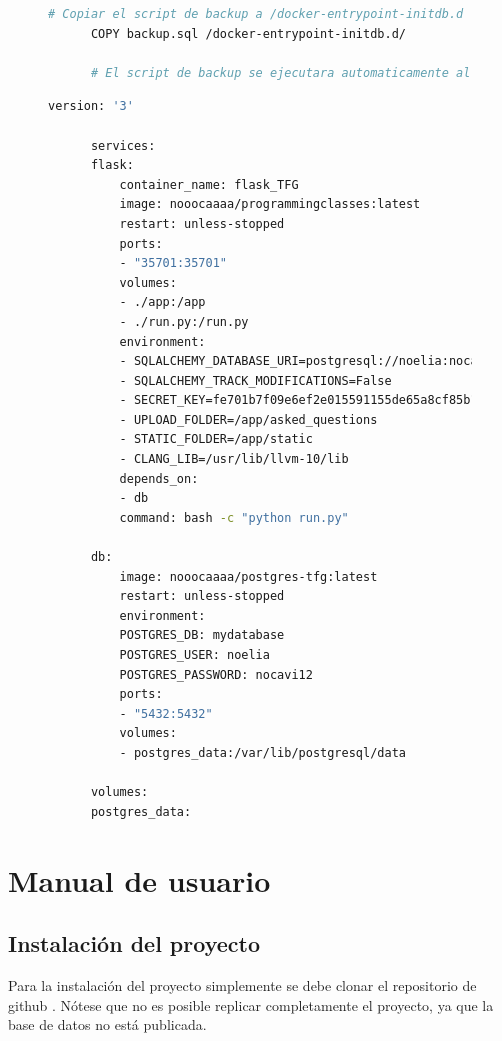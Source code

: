 \begin{appendices}
\begin{figure}[H]
\begin{lstlisting}[language=bash, caption={Dockerfile para la creación de la imagen de la base de datos}, label=fig:dockerfilebbdd]
      # Copiar el script de backup a /docker-entrypoint-initdb.d
      COPY backup.sql /docker-entrypoint-initdb.d/
      
      # El script de backup se ejecutara automaticamente al iniciar el contenedor
    \end{lstlisting}
  \end{figure}

  \begin{figure}[H]
    \centering
    \begin{lstlisting}[language=bash, caption={Fichero Podman-compose para desplegar la bbdd y la app en el servidor}, label=fig:podmancompose]
      version: '3'
  
      services:
      flask:
          container_name: flask_TFG
          image: nooocaaaa/programmingclasses:latest
          restart: unless-stopped
          ports:
          - "35701:35701"
          volumes:
          - ./app:/app
          - ./run.py:/run.py
          environment:
          - SQLALCHEMY_DATABASE_URI=postgresql://noelia:nocavi12@db:5432/mydatabase
          - SQLALCHEMY_TRACK_MODIFICATIONS=False
          - SECRET_KEY=fe701b7f09e6ef2e015591155de65a8cf85b160e6a75490a
          - UPLOAD_FOLDER=/app/asked_questions
          - STATIC_FOLDER=/app/static
          - CLANG_LIB=/usr/lib/llvm-10/lib
          depends_on:
          - db
          command: bash -c "python run.py"
  
      db:
          image: nooocaaaa/postgres-tfg:latest
          restart: unless-stopped
          environment:
          POSTGRES_DB: mydatabase
          POSTGRES_USER: noelia
          POSTGRES_PASSWORD: nocavi12
          ports:
          - "5432:5432"
          volumes:
          - postgres_data:/var/lib/postgresql/data
  
      volumes:
      postgres_data:
    \end{lstlisting}
  \end{figure}

\chapter{Manual de usuario} \label{imagenessistema}

\section {Instalación del proyecto}

Para la instalación del proyecto simplemente se debe clonar el repositorio de github \cite{personalgithub}. Nótese que no es posible replicar completamente el proyecto, ya que la base de datos no está publicada. 


\end{appendices}
